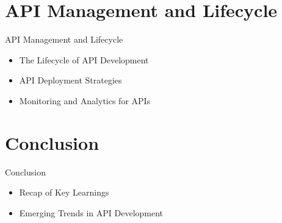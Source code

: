 \documentclass{beamer}
\begin{document}
\section{API Management and Lifecycle}
\begin{frame}{API Management and Lifecycle}
  \begin{itemize}
    \item The Lifecycle of API Development
    \item API Deployment Strategies
    \item Monitoring and Analytics for APIs
  \end{itemize}
\end{frame}

\section{Conclusion}
\begin{frame}{Conclusion}
  \begin{itemize}
    \item Recap of Key Learnings
    \item Emerging Trends in API Development
  \end{itemize}
\end{frame}
\end{document}
